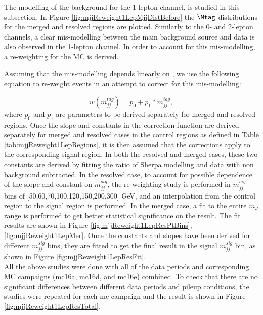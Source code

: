 The modelling of the \Wjets background for the 1-lepton channel,
is studied in this subsection. 
In Figure \ref{fig:mjjReweight1LepMjjDistBefore} the $\Mtag$ distributions for the merged and resolved regions are plotted.  
Similarly to the 0- and 2-lepton channels, 
a clear mis-modelling between the main background source and data is also observed in the 1-lepton channel. 
In order to account for this mis-modelling, a re-weighting for the \Wjets MC is derived. 

Assuming that the mis-modelling depends linearly on \mjjtag, we use the following equation 
to re-weight \Wjets events in an attempt to correct for this mis-modelling:

\begin{equation}
  w(m_{jj}^{tag}) =  p_0 + p_1 * m_{jj}^{tag} ,
\end{equation}
where $p_0$ and $p_1$
are parameters to be derived separately for merged and resolved regions. Once the slope and constants in the correction function are derived separately for merged and resolved cases in the control regions as defined in Table \ref{tab:mjjReweight1LepRegions}, it is then assumed that the corrections apply to the corresponding signal region. In both the resolved and merged cases, these two constants are derived by fitting the ratio of Sherpa \Wjets modelling and data with non \Wjets background subtracted. In the resolved case, to account for possible dependence of the slope and constant on $m_{jj}^{sig}$, the re-weighting study is performed in $m_{jj}^{sig}$ bins of [50,60,70,100,120,150,200,300] GeV, and an interpolation from the control region to the signal region is performed. In the merged case, a fit to the entire $m_{J}$ range is performed to get better statistical significance on the result. The fit results are shown in Figure \ref{fig:mjjReweight1LepResPtBins}, \ref{fig:mjjReweight1LepMer}. Once the constants and slopes have been derived for different $m_{jj}^{sig}$ bins, they are fitted to get the final result in the signal $m_{jj}^{sig}$ bin, as shown in Figure \ref{fig:mjjReweight1LepResFit}. \\

All the above studies were done with all of the data periods and corresponding MC campaigns (mc16a, mc16d, and mc16e) combined. To check that there are no significant differences between different data periods and pileup conditions, the studies were repeated for each mc campaign and the result is shown in Figure \ref{fig:mjjReweight1LepResTotal}. 


